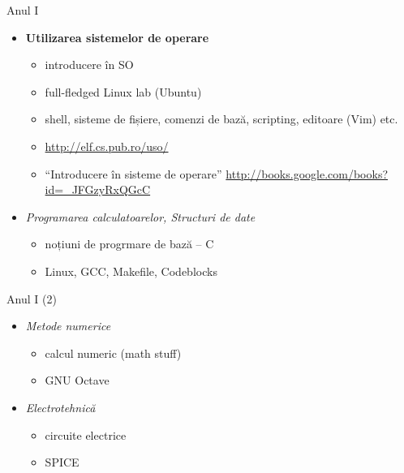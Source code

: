 \documentclass{beamer}
\begin{document}

\begin{frame}{Anul I}
	\begin{itemize}
		\item \textbf{Utilizarea sistemelor de operare}
			\begin{itemize}
				\item introducere în SO
				\item full-fledged Linux lab (Ubuntu)
				\item shell, sisteme de fișiere, comenzi de bază, scripting,
				editoare (Vim) etc.
				\item \url{http://elf.cs.pub.ro/uso/}
				\item ``Introducere în sisteme de operare''
				\url{http://books.google.com/books?id=_JFGzyRxQGcC}
			\end{itemize}
		\item \textit{Programarea calculatoarelor, Structuri de date}
			\begin{itemize}
				\item noțiuni de progrmare de bază -- C
				\item Linux, GCC, Makefile, Codeblocks
			\end{itemize}
	\end{itemize}
\end{frame}

\begin{frame}{Anul I (2)}
	\begin{itemize}
		\item \textit{Metode numerice}
			\begin{itemize}
				\item calcul numeric (math stuff)
				\item GNU Octave
			\end{itemize}
		\item \textit{Electrotehnică}
			\begin{itemize}
				\item circuite electrice
				\item SPICE
			\end{itemize}
	\end{itemize}
\end{frame}
\end{document}
